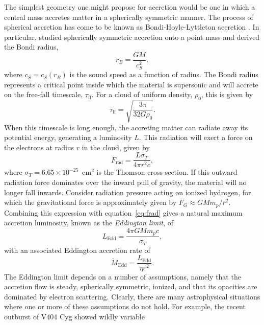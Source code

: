 The simplest geometry one might propose for accretion
would be one in which a central mass accretes matter in a spherically
symmetric manner.
The process of spherical accretion has come to be known as 
Bondi-Hoyle-Lyttleton accretion \citep{hoyle1939,bondi1944}.
In particular, \cite{bondi1952} studied spherically symmetric 
accretion onto a point mass and derived the Bondi radius,
\begin{equation}
r_B = \frac{G M}{c_S^2},
\label{eq:bondi}
\end{equation} 
where $c_S = c_S(r_B)$ is the sound speed as a function of radius.
The Bondi radius represents a critical point inside which the material
is supersonic and will accrete on the free-fall timescale, $\tau_{\mathrm{ff}}$.
For a cloud of uniform density, $\rho_0$, this is given by 
\begin{equation}
\tau_{\mathrm{ff}} = \sqrt{\frac{3 \pi}{32 G \rho_0}}.
\label{eq:frad}
\end{equation} 
When this timescale is long enough, the accreting matter
can radiate away its potential energy, generating a luminosity $L$. 
This radiation will exert a force on the electrons at radius $r$ in the cloud, 
given by
\begin{equation}
F_{\mathrm{rad}} = \frac{L \sigma_T}{4 \pi r^2 c},
\label{eq:frad}
\end{equation} 
where $\sigma_T = 6.65\times10^{-25}$~cm$^2$ is the Thomson cross-section.
If this outward radiation force dominates over the inward pull of gravity, 
the material will no longer fall inwards. Consider
radiation pressure acting on ionized hydrogen, for which the gravitational
force is approximately given by $F_G \approx G M m_p / r^2$. Combining this expression
with equation~\ref{eq:frad} gives a natural
maximum accretion luminosity, known as the {\em Eddington limit}, of
\begin{equation}
L_{\mathrm{Edd}} = \frac{4 \pi G M m_p c}{\sigma_T},
\label{eq:bondi}
\end{equation} 
with an associated Eddington accretion rate of 
\begin{equation}
\dot{M}_{\mathrm{Edd}} = \frac{L_{\mathrm{Edd}}}{\eta c^2}.
\label{eq:bondi}
\end{equation} 
The Eddington limit depends on a number of assumptions, namely
that the accretion flow is steady, spherically symmetric, ionized,
and that its opacities are dominated by electron scattering.
Clearly, there are many astrophysical situations where one or more
of these assumptions do not hold.
For example, the recent outburst of V404 Cyg showed wildly variable
